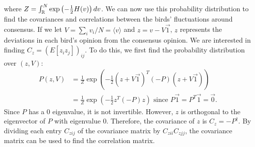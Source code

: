 \documentclass{article}
\begin{document}
where $Z=\int_{\mathbb{R}}^N\exp\left(-\frac{1}{2}H(v)\right)dv$. We can now use this probability distribution to find the  covariances and correlations between the birds' fluctuations around consensus.  If we let $V=\sum_iv_i/N=\langle v\rangle$ and $z=v-V\vec{1}$, $z$ represents the deviations in each bird's opinion from the consensus opinion. We are interested in finding $C_z=\left(E[z_iz_j]\right)_{ij}$. To do this, we first find the probability distribution over $(z,V)$: 
\begin{align*}
P(z,V)&=\frac{1}{Z}\exp\left(-\frac{1}{2}(z+V\vec{1})^T(-P)(z+V\vec{1})\right)
\\&=\frac{1}{Z}\exp\left(-\frac{1}{2}z^T(-P)z\right) \text{ since }P\vec{1}=P^T\vec{1}=\vec{0}.
\end{align*}
Since $P$ has a $0$ eigenvalue, it is not invertible. However, $z$ is orthogonal to the eigenvector of $P$ with eigenvalue $0$. Therefore, the covariance of $z$ is $C_z=-P^\dagger$.
By dividing each entry $C_{zij}$ of the covariance matrix by $C_{zii}C_{zjj}$, the covariance matrix can be used to find the correlation matrix.
\end{document}
